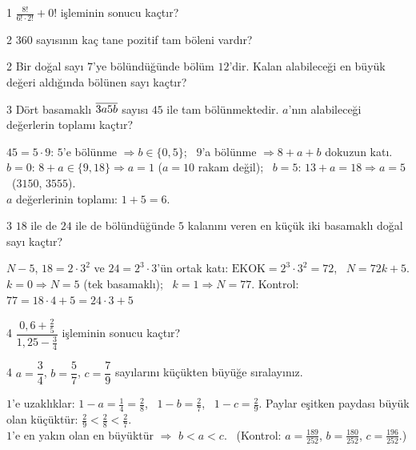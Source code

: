 \begin{karma}{1}
\(\tfrac{8!}{6!\cdot 2!}+0!\) işleminin sonucu kaçtır?
\end{karma}

\begin{karma}{2}
\(360\) sayısının kaç tane pozitif tam böleni vardır?
\end{karma}

\begin{karma}{2}
Bir doğal sayı \(7\)'ye bölündüğünde bölüm \(12\)'dir. Kalan alabileceği en büyük değeri aldığında bölünen sayı kaçtır?
\end{karma}

\begin{karma}{3}
Dört basamaklı \(\overline{3a5b}\) sayısı \(45\) ile tam bölünmektedir. \(a\)'nın alabileceği değerlerin toplamı kaçtır?
\end{karma}
\begin{cozum}
\(45=5\cdot 9\): \(5\)'e bölünme \(\Rightarrow b\in\{0,5\}\); \ \(9\)'a bölünme \(\Rightarrow 8+a+b\) dokuzun katı.\\
\(b=0\): \(8+a\in\{9,18\}\Rightarrow a=1\) (\(a=10\) rakam değil); \ \(b=5\): \(13+a=18\Rightarrow a=5\) \ (\(3150\), \(3555\)).\\
\(a\) değerlerinin toplamı: \(1+5=6\).
\end{cozum}

\begin{karma}{3}
\(18\) ile de \(24\) ile de bölündüğünde \(5\) kalanını veren en küçük iki basamaklı doğal sayı kaçtır?
\end{karma}
\begin{cozum}
\(N-5\), \(18=2\cdot 3^2\) ve \(24=2^3\cdot 3\)'ün ortak katı: \(\text{EKOK}=2^3\cdot 3^2=72\), \ \(N=72k+5\).\\
\(k=0\Rightarrow N=5\) (tek basamaklı); \ \(k=1\Rightarrow N=77\). \quad Kontrol: \(77=18\cdot 4+5=24\cdot 3+5\) \checkmark
\end{cozum}

\begin{karma}{4}
\(\dfrac{0{,}6+\frac25}{1{,}25-\frac34}\) işleminin sonucu kaçtır?
\end{karma}

\begin{karma}{4}
\(a=\dfrac34\), \(b=\dfrac57\), \(c=\dfrac79\) sayılarını küçükten büyüğe sıralayınız.
\end{karma}
\begin{cozum}
\(1\)'e uzaklıklar: \(1-a=\frac14=\frac28\), \ \(1-b=\frac27\), \ \(1-c=\frac29\). Paylar eşitken paydası büyük olan küçüktür: \(\frac29<\frac28<\frac27\).\\
\(1\)'e en yakın olan en büyüktür \(\Rightarrow\) \(b<a<c\). \ (Kontrol: \(a=\frac{189}{252}\), \(b=\frac{180}{252}\), \(c=\frac{196}{252}\).)
\end{cozum}

